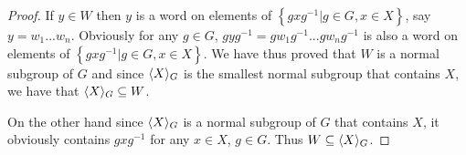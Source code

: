 \begin{proof}
    If $y \in W$ then $y$ is a word on elements of $\left\{gxg^{-1}|g \in G, x \in X\right\}$, say $y = w_1...w_n$. Obviously for any $g \in G$, $gyg^{-1} =gw_1g^{-1}...gw_ng^{-1}$ is also a word on elements of $\left\{gxg^{-1}|g \in G, x \in X\right\}$. We have thus proved that $W$ is a normal subgroup of $G$ and since $\langle X \rangle_G$ is the smallest normal subgroup that contains $X$, we have that $\langle X \rangle_G \subseteq W$.
    
    On the other hand since $\langle X \rangle_G$ is a normal subgroup of $G$ that contains $X$, it obviously contains $gxg^{-1}$ for any $x \in X$, $g \in G$. Thus $W \subseteq \langle X \rangle_G$.
\end{proof}